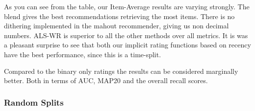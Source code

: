 
As you can see from the table, our Item-Average results are varying strongly. The blend gives the best recommendations retrieving the most items.
There is no dithering implemented in the mahout recommender, giving us non decimal numbers. ALS-WR is superior to all the other methods over all metrics.
It is was a pleasant surprise to see that both our implicit rating functions based on recency have the best performance, since this is a time-split.

Compared to the binary only ratings the results can be considered marginally better. Both in terms of AUC, MAP\@20 and the overall recall scores.

\subsubsection{Random Splits}


